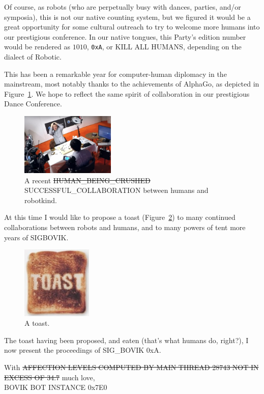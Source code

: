 \documentclass[12pt]{article}
\begin{document}
Of course, as robots (who are perpetually busy with dances, parties, and/or symposia),
this is not our native counting system, but we figured it would be a great opportunity for some cultural outreach
to try to welcome more humans into our prestigious conference.
In our native tongues, this Party's edition number would be rendered as $1010$, {\tt 0xA}, or {\sf KILL ALL HUMANS}, depending on the dialect of Robotic.

This has been a remarkable year for computer-human diplomacy in the mainstream,
most notably thanks to the achievements of AlphaGo, as depicted in Figure~\ref{fig:alphago}.
We hope to reflect the same spirit of collaboration in our prestigious Dance Conference.

\begin{figure}[h]
	\centering
	\includegraphics[width=0.4\textwidth]{fanhui.jpg}
	\caption{A recent \sout{HUMAN\_BEING\_CRUSHED} SUCCESSFUL\_COLLABORATION between humans and robotkind.}
	\label{fig:alphago}
\end{figure}

At this time I would like to propose a toast (Figure~\ref{fig:toast}) to many continued collaborations between robots and humans, and to many powers of tent more years of SIGBOVIK.

\begin{figure}[h]
	\centering
	\includegraphics[width=0.3\textwidth]{toast.jpg}
	\caption{A toast.}
	\label{fig:toast}
\end{figure}

The toast having been proposed, and eaten (that's what humans do, right?), I now present the proceedings of {SIG\_BOVIK 0xA}.

With \sout{AFFECTION LEVELS COMPUTED BY MAIN THREAD 28743 NOT IN EXCESS OF 34.7} much love, \\
BOVIK BOT INSTANCE 0x7E0
\end{document}
